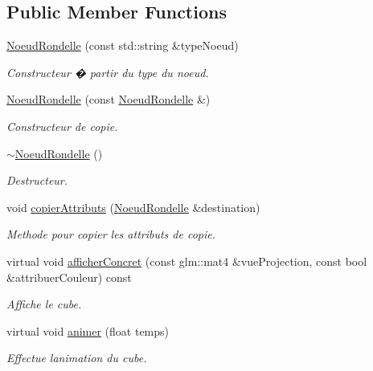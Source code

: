 \subsection*{Public Member Functions}
\begin{DoxyCompactItemize}
\item 
\hyperlink{group__inf2990_ga34a329c95e92769fb7ee559f9d8190ee}{Noeud\+Rondelle} (const std\+::string \&type\+Noeud)
\begin{DoxyCompactList}\small\item\em Constructeur � partir du type du noeud. \end{DoxyCompactList}\item 
\hyperlink{group__inf2990_gab89e7312f59c3296d502199a04b84255}{Noeud\+Rondelle} (const \hyperlink{class_noeud_rondelle}{Noeud\+Rondelle} \&)
\begin{DoxyCompactList}\small\item\em Constructeur de copie. \end{DoxyCompactList}\item 
\hyperlink{group__inf2990_ga72fbc525724f54469d00c55052403581}{$\sim$\+Noeud\+Rondelle} ()
\begin{DoxyCompactList}\small\item\em Destructeur. \end{DoxyCompactList}\item 
void \hyperlink{group__inf2990_gab79ced8b1f9779fc741bced080f8357f}{copier\+Attributs} (\hyperlink{class_noeud_rondelle}{Noeud\+Rondelle} \&destination)
\begin{DoxyCompactList}\small\item\em Methode pour copier les attributs de copie. \end{DoxyCompactList}\item 
virtual void \hyperlink{group__inf2990_gae36211d198101ecb9ad8f252a3483a8b}{afficher\+Concret} (const glm\+::mat4 \&vue\+Projection, const bool \&attribuer\+Couleur) const
\begin{DoxyCompactList}\small\item\em Affiche le cube. \end{DoxyCompactList}\item 
virtual void \hyperlink{group__inf2990_ga016689cb1c1968037902ae0013397bff}{animer} (float temps)
\begin{DoxyCompactList}\small\item\em Effectue l\textquotesingle{}animation du cube. \end{DoxyCompactList}\item 

\end{DoxyCompactItemize}
